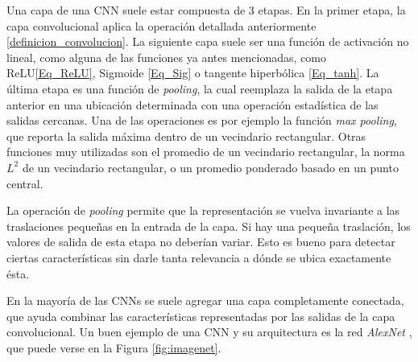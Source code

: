 \documentclass[spanish]{article}
\theoremstyle{definition}
\theoremstyle{remark}
\numberwithin{equation}{section}
\numberwithin{equation}{section} %
\begin{document}
Una capa de una CNN suele estar compuesta de 3 etapas. En la primer etapa, la capa convolucional aplica la operación detallada anteriormente \eqref{definicion_convolucion}. La siguiente capa suele ser una función de activación no lineal, como alguna de las funciones ya antes mencionadas, como ReLU\eqref{Eq_ReLU}, Sigmoide \eqref{Eq_Sig} o tangente hiperbólica \eqref{Eq_tanh}. La última etapa es una función de \textit{pooling}, la cual reemplaza la salida de la etapa anterior en una ubicación determinada con una
operación estadística de las salidas cercanas. Una de las operaciones es por ejemplo la función \textit{max pooling}, que reporta la salida máxima dentro de un vecindario rectangular. Otras funciones muy utilizadas son el promedio de un vecindario rectangular, la norma $L^{2}$ de un vecindario rectangular, o un promedio ponderado basado en un punto central. \par
La operación de \textit{pooling} permite que la representación se vuelva invariante a las traslaciones pequeñas en la entrada de la capa. Si hay una pequeña traslación, los valores de salida de esta etapa no deberían variar. Esto es bueno para detectar ciertas características sin darle tanta relevancia a dónde se ubica exactamente ésta.  \par
En la mayoría de las CNNs se suele agregar una capa completamente conectada, que ayuda combinar las características representadas por las salidas de la capa convolucional. Un buen ejemplo de una CNN y su arquitectura es la red \textit{AlexNet} \cite{krizhevsky2012imagenet}, que puede verse en la Figura \ref{fig:imagenet}.
\end{document}
